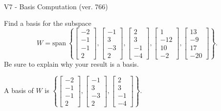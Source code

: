 \begin{exercise}
  \begin{exerciseTitle}V7 - Basis Computation (ver. 766)\end{exerciseTitle}
  \begin{exerciseStatement}
    Find a basis for the subspace 
\[W=\mathrm{span}\ \left\{\left[\begin{array}{r}
-2 \\
-1 \\
-1 \\
2
\end{array}\right] , \left[\begin{array}{r}
-1 \\
3 \\
-3 \\
2
\end{array}\right] , \left[\begin{array}{r}
2 \\
3 \\
-1 \\
-4
\end{array}\right] , \left[\begin{array}{r}
1 \\
-12 \\
10 \\
-2
\end{array}\right] , \left[\begin{array}{r}
13 \\
-9 \\
17 \\
-20
\end{array}\right]\right\}.\]
 Be sure to explain why your result is a basis.


  \end{exerciseStatement}
  \begin{exerciseAnswer}
   A basis of \(W\) is  \(\left\{\left[\begin{array}{r}
-2 \\
-1 \\
-1 \\
2
\end{array}\right] , \left[\begin{array}{r}
-1 \\
3 \\
-3 \\
2
\end{array}\right] , \left[\begin{array}{r}
2 \\
3 \\
-1 \\
-4
\end{array}\right]\right\}\).
  


  \end{exerciseAnswer}
\end{exercise}
